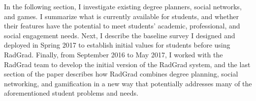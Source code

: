 In the following section, I investigate existing degree planners, social networks, and games. I summarize what is currently available for students, and whether their features have the potential to meet students' academic, professional, and social engagement needs. Next, I describe the baseline survey I designed and deployed in Spring 2017 to establish initial  values for students before using RadGrad. Finally, from September 2016 to May 2017, I worked with the RadGrad team to develop the initial version of the RadGrad system, and the last section of the paper describes how RadGrad combines degree planning, social networking, and gamification in a new way that potentially addresses many of the aforementioned student problems and needs.  


